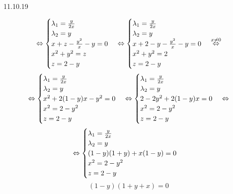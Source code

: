 \documentclass[12pt, fleqn]{article}
\begin{document}
\begin{lect} {11.10.19}
\begin{Task}[3]
            \[\Leftrightarrow \begin{cases}
                \lambda_1 = \frac{y}{2x}\\
                \lambda_2 = y\\
                x + z - \frac{y^2}{x} - y = 0\\
                x^2 + y^2 = z\\
                z = 2 - y
            \end{cases} \Leftrightarrow \begin{cases}
                \lambda_1 = \frac{y}{2x}\\
                \lambda_2 = y\\
                x + 2 - y - \frac{y^2}{x} - y = 0\\
                x^2 + y^2 = 2\\
                z = 2 - y
            \end{cases} \overset{x \neq 0}{ \Leftrightarrow}\]
            \[\Leftrightarrow \begin{cases}
                \lambda_1 = \frac{y}{2x}\\
                \lambda_2 = y\\
                x^2 + 2(1 - y)x - y^2 = 0\\
                x^2 = 2 - y^2\\
                z = 2 - y
            \end{cases} \Leftrightarrow \begin{cases}
                \lambda_1 = \frac{y}{2x}\\
                \lambda_2 = y\\
                2 - 2y^2 + 2(1 - y)x = 0\\
                x^2 = 2 - y^2\\
                z = 2 - y
            \end{cases} \Leftrightarrow\]
            \[\Leftrightarrow \begin{cases}
                \lambda_1 = \frac{y}{2x}\\
                \lambda_2 = y\\
                (1 - y)(1 + y) + x(1 - y) = 0\\
                x^2 = 2 - y^2\\
                z = 2 - y
            \end{cases}\]
            \[(1 - y)(1 + y + x) = 0\]


\end{Task}
\end{lect}
\end{document}
